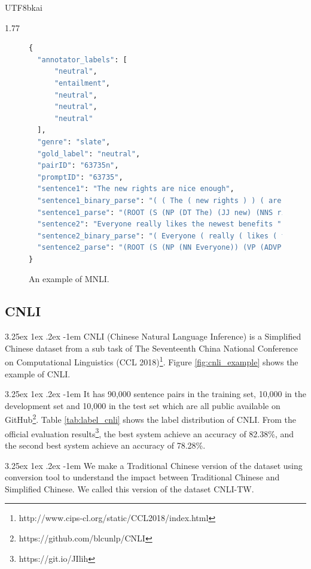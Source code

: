 \documentclass[12pt]{article}
\makeatletter
\renewcommand\paragraph{\@startsection{paragraph}{5}{\z@}%
  {3.25ex \@plus1ex \@minus.2ex}%
  {-1em}%
  {\normalfont\normalsize\bfseries}}
\makeatother
\begin{document}
\begin{CJK*}{UTF8}{bkai}
\begin{spacing}{1.77}
\begin{figure}
\caption[An example of MNLI]{An example of MNLI.}
\begin{minipage}{\linewidth}
\begin{lstlisting}[language=Python]
{
  "annotator_labels": [
      "neutral",
      "entailment",
      "neutral",
      "neutral",
      "neutral"
  ],
  "genre": "slate",
  "gold_label": "neutral",
  "pairID": "63735n",
  "promptID": "63735",
  "sentence1": "The new rights are nice enough",
  "sentence1_binary_parse": "( ( The ( new rights ) ) ( are ( nice enough ) ) )",
  "sentence1_parse": "(ROOT (S (NP (DT The) (JJ new) (NNS rights)) (VP (VBP are) (ADJP (JJ nice) (RB enough)))))",
  "sentence2": "Everyone really likes the newest benefits ",
  "sentence2_binary_parse": "( Everyone ( really ( likes ( the ( newest benefits ) ) ) ) )",
  "sentence2_parse": "(ROOT (S (NP (NN Everyone)) (VP (ADVP (RB really)) (VBZ likes) (NP (DT the) (JJS newest) (NNS benefits)))))"
}
\end{lstlisting}
\end{minipage}
\label{fig:mnli_example}
\end{figure}

\subsection{CNLI}
\paragraph{}
CNLI (Chinese Natural Language Inference) is a Simplified Chinese dataset from a sub task of The Seventeenth China National Conference on Computational Linguistics (CCL 2018)\footnote{http://www.cips-cl.org/static/CCL2018/index.html}. Figure \ref{fig:cnli_example} shows the example of CNLI.

\paragraph{}
It has 90,000 sentence pairs in the training set, 10,000 in the development set and 10,000 in the test set which are all public available on GitHub\footnote{https://github.com/blcunlp/CNLI}. Table \ref{tab:label_cnli} shows the label distribution of CNLI. From the official evaluation results\footnote{https://git.io/JIlih}, the best system achieve an accuracy of 82.38\%, and the second best system achieve an accuracy of 78.28\%.

\paragraph{}
We make a Traditional Chinese version of the dataset using conversion tool to understand the impact between Traditional Chinese and Simplified Chinese. We called this version of the dataset CNLI-TW.


\end{spacing}
\end{CJK*}
\end{document}
